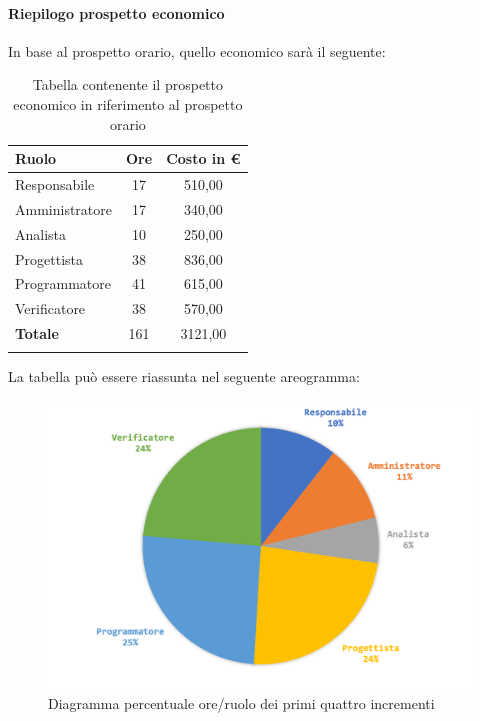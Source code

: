 		\paragraph{Riepilogo prospetto economico}
		In base al prospetto orario, quello economico sarà il seguente: 
		
		\begin{longtable}{|l|c|c|}
			\hline
			\rowcolor{lighter-grayer}
			\textbf{Ruolo} & \textbf{Ore} & \textbf{Costo in € } \\
			\hline
			\endfirsthead
			
			\hline
			Responsabile 	    & 17 & 510,00\\
			\hline 
			\hline
			Amministratore	   & 17 & 340,00\\
			\hline
			\hline
			Analista 				& 10 & 250,00\\
			\hline
			\hline
			Progettista 		   & 38 & 836,00\\
			\hline
			\hline
			Programmatore 	  & 41 & 615,00\\
			\hline
			\hline
			Verificatore 		   & 38 & 570,00\\
			\hline
			\textbf{Totale} 	 & 161 & 3121,00\\
			\hline
			\caption{Tabella contenente il prospetto economico in riferimento al prospetto orario}
		\end{longtable}
		\pagebreak
		
		La tabella può essere riassunta nel seguente areogramma:
		\begin{figure}[H]
			\centering
			\includegraphics[width=0.8\linewidth]{./images/preventivo/incremento1-4-2.png}
			\caption{Diagramma percentuale ore/ruolo dei primi quattro incrementi}
			\label{fig:diagramma costi ruolo incrementi I-IV}
		\end{figure}
		
